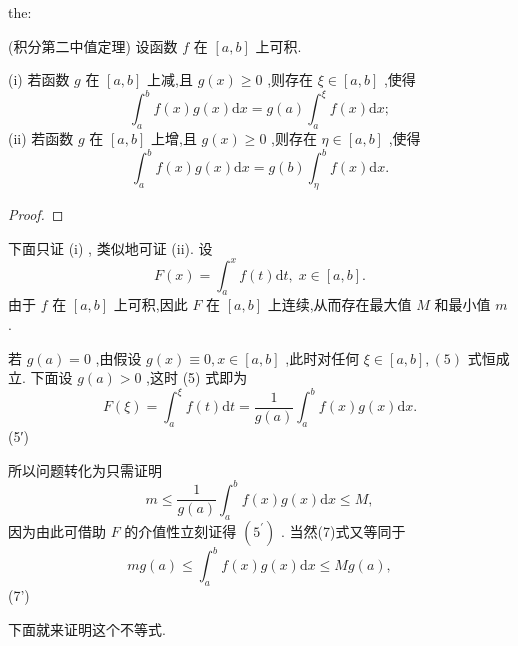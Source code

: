 \begin{theorem}{}{the:}

\end{theorem}
 (积分第二中值定理) 设函数 \(f\) 在 \(\left\lbrack  {a,b}\right\rbrack\) 上可积.

(i) 若函数 \(g\) 在 \(\left\lbrack  {a,b}\right\rbrack\) 上减,且 \(g\left( x\right)  \geq  0\) ,则存在 \(\xi  \in  \left\lbrack  {a,b}\right\rbrack\) ,使得
\[
{\int }_{a}^{b}f\left( x\right) g\left( x\right) \mathrm{d}x = g\left( a\right) {\int }_{a}^{\xi }f\left( x\right) \mathrm{d}x; \tag{5}
\]
(ii) 若函数 \(g\) 在 \(\left\lbrack  {a,b}\right\rbrack\) 上增,且 \(g\left( x\right)  \geq  0\) ,则存在 \(\eta  \in  \left\lbrack  {a,b}\right\rbrack\) ,使得
\[
{\int }_{a}^{b}f\left( x\right) g\left( x\right) \mathrm{d}x = g\left( b\right) {\int }_{\eta }^{b}f\left( x\right) \mathrm{d}x. \tag{6}
\]
\begin{proof}

\end{proof}
下面只证 (i) , 类似地可证 (ii). 设
\[
F\left( x\right)  = {\int }_{a}^{x}f\left( t\right) \mathrm{d}t,\;x \in  \left\lbrack  {a,b}\right\rbrack  .
\]
由于 \(f\) 在 \(\left\lbrack  {a,b}\right\rbrack\) 上可积,因此 \(F\) 在 \(\left\lbrack  {a,b}\right\rbrack\) 上连续,从而存在最大值 \(M\) 和最小值 \(m\) .

若 \(g\left( a\right)  = 0\) ,由假设 \(g\left( x\right)  \equiv  0,x \in  \left\lbrack  {a,b}\right\rbrack\) ,此时对任何 \(\xi  \in  \left\lbrack  {a,b}\right\rbrack  ,\left( 5\right)\) 式恒成立. 下面设 \(g\left( a\right)  > 0\) ,这时 (5) 式即为
\[
F\left( \xi \right)  = {\int }_{a}^{\xi }f\left( t\right) \mathrm{d}t = \frac{1}{g\left( a\right) }{\int }_{a}^{b}f\left( x\right) g\left( x\right) \mathrm{d}x.
\]
 (5′)

所以问题转化为只需证明
\[
m \leq  \frac{1}{g\left( a\right) }{\int }_{a}^{b}f\left( x\right) g\left( x\right) \mathrm{d}x \leq  M, \tag{7}
\]
因为由此可借助 \(F\) 的介值性立刻证得 \(\left( {5}^{\prime }\right)\) . 当然(7)式又等同于
\[
{mg}\left( a\right)  \leq  {\int }_{a}^{b}f\left( x\right) g\left( x\right) \mathrm{d}x \leq  {Mg}\left( a\right) ,
\]
 (7')

下面就来证明这个不等式.


